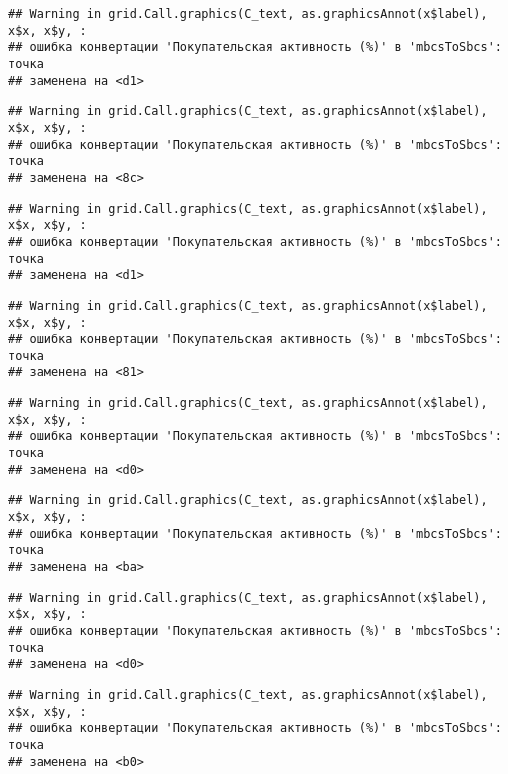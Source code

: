 \documentclass[
]{article}
\begin{document}
\begin{verbatim}
## Warning in grid.Call.graphics(C_text, as.graphicsAnnot(x$label), x$x, x$y, :
## ошибка конвертации 'Покупательская активность (%)' в 'mbcsToSbcs': точка
## заменена на <d1>
\end{verbatim}

\begin{verbatim}
## Warning in grid.Call.graphics(C_text, as.graphicsAnnot(x$label), x$x, x$y, :
## ошибка конвертации 'Покупательская активность (%)' в 'mbcsToSbcs': точка
## заменена на <8c>
\end{verbatim}

\begin{verbatim}
## Warning in grid.Call.graphics(C_text, as.graphicsAnnot(x$label), x$x, x$y, :
## ошибка конвертации 'Покупательская активность (%)' в 'mbcsToSbcs': точка
## заменена на <d1>
\end{verbatim}

\begin{verbatim}
## Warning in grid.Call.graphics(C_text, as.graphicsAnnot(x$label), x$x, x$y, :
## ошибка конвертации 'Покупательская активность (%)' в 'mbcsToSbcs': точка
## заменена на <81>
\end{verbatim}

\begin{verbatim}
## Warning in grid.Call.graphics(C_text, as.graphicsAnnot(x$label), x$x, x$y, :
## ошибка конвертации 'Покупательская активность (%)' в 'mbcsToSbcs': точка
## заменена на <d0>
\end{verbatim}

\begin{verbatim}
## Warning in grid.Call.graphics(C_text, as.graphicsAnnot(x$label), x$x, x$y, :
## ошибка конвертации 'Покупательская активность (%)' в 'mbcsToSbcs': точка
## заменена на <ba>
\end{verbatim}

\begin{verbatim}
## Warning in grid.Call.graphics(C_text, as.graphicsAnnot(x$label), x$x, x$y, :
## ошибка конвертации 'Покупательская активность (%)' в 'mbcsToSbcs': точка
## заменена на <d0>
\end{verbatim}

\begin{verbatim}
## Warning in grid.Call.graphics(C_text, as.graphicsAnnot(x$label), x$x, x$y, :
## ошибка конвертации 'Покупательская активность (%)' в 'mbcsToSbcs': точка
## заменена на <b0>
\end{verbatim}
\end{document}
